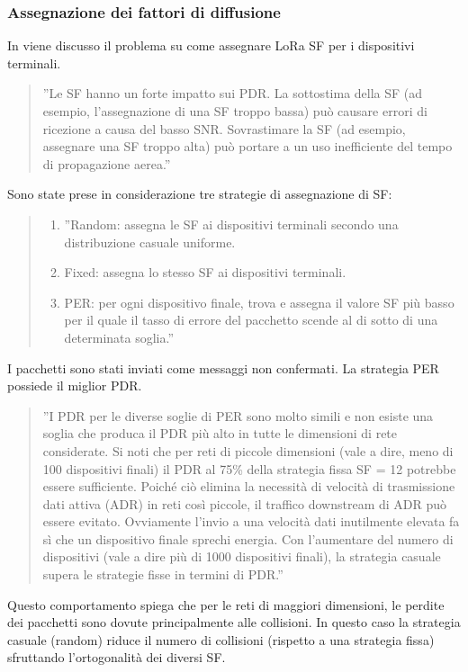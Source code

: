 \documentclass[a4paper]{report} %
\begin{document}
\subsubsection{Assegnazione dei fattori di diffusione}
In \cite{art:rif.49} viene discusso il problema su come assegnare LoRa SF per i dispositivi terminali. 
\begin{quote}
	''Le SF hanno un forte impatto sui PDR. La sottostima della SF (ad esempio, l'assegnazione di una SF troppo bassa) può causare errori di ricezione a causa del basso SNR. Sovrastimare la SF (ad esempio, assegnare una SF troppo alta) può portare a un uso inefficiente del tempo di propagazione aerea.''
\end{quote}
Sono state prese in considerazione tre strategie di assegnazione di SF:
\begin{quote}
	\begin{enumerate}
		\item ''Random: assegna le SF ai dispositivi terminali secondo una distribuzione casuale uniforme.
		\item Fixed: assegna lo stesso SF ai dispositivi terminali.
		\item PER: per ogni dispositivo finale, trova e assegna il valore SF più basso per il quale il tasso di errore del pacchetto scende al di sotto di una determinata soglia.''
	\end{enumerate}
\end{quote}
I pacchetti sono stati inviati come messaggi non confermati. La strategia PER possiede il miglior PDR. 
\begin{quote}
	''I PDR per le diverse soglie di PER sono molto simili e non esiste una soglia che produca il PDR più alto in tutte le dimensioni di rete considerate. Si noti che per reti di piccole dimensioni (vale a dire, meno di 100 dispositivi finali) il PDR al 75\% della strategia fissa SF = 12 potrebbe essere sufficiente. Poiché ciò elimina la necessità di velocità di trasmissione dati attiva (ADR) in reti così piccole, il traffico downstream di ADR può essere evitato. Ovviamente l'invio a una velocità dati inutilmente elevata fa sì che un dispositivo finale sprechi energia. Con l'aumentare del numero di dispositivi (vale a dire più di 1000 dispositivi finali), la strategia casuale supera le strategie fisse in termini di PDR.''
\end{quote}
Questo comportamento spiega che per le reti di maggiori dimensioni, le perdite dei pacchetti sono dovute principalmente alle collisioni. In questo caso la strategia casuale (random) riduce il numero di collisioni (rispetto a una strategia fissa) sfruttando l'ortogonalità dei diversi SF.
\end{document}
